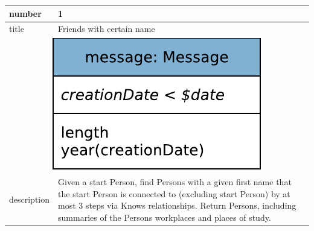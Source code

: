 \renewcommand*{\arraystretch}{1.5}
\noindent\begin{tabularx}{17cm}{|p{1.95cm}|X|}
	\hline
	number      & 1                                                          \\ \hline
	title       & Friends with certain name                                                           \\ \hline
	\multicolumn{2}{|c|}{ \includegraphics[scale=\patternscale,margin=0cm .2cm]{patterns/q01}} \\ \hline
	description & Given a start Person, find Persons with a given first name that the
start Person is connected to (excluding start Person) by at most 3 steps
via Knows relationships. Return Persons, including summaries of the
Persons workplaces and places of study.
 \\ \hline
	

\end{tabularx}
